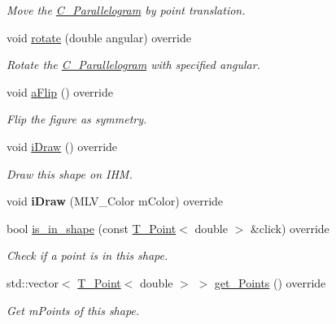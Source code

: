 \begin{DoxyCompactItemize}
\begin{DoxyCompactList}\small\item\em Move the \hyperlink{classParallelogram}{C_Parallelogram} by point translation. \end{DoxyCompactList}\item
void \hyperlink{classParallelogram_ac498f6a15dea236ecc49bece023d17b0}{rotate} (double angular) override
\begin{DoxyCompactList}\small\item\em Rotate the \hyperlink{classParallelogram}{C_Parallelogram} with specified angular. \end{DoxyCompactList}\item
\mbox{\label{classParallelogram_a51f002e90b7bf6c5d875cc094c22f7c1}} 
void \hyperlink{classParallelogram_a51f002e90b7bf6c5d875cc094c22f7c1}{aFlip} () override
\begin{DoxyCompactList}\small\item\em Flip the figure as symmetry. \end{DoxyCompactList}\item 
\mbox{\label{classParallelogram_a73e3657bf024787b57ccdd8035a6fdef}} 
void \hyperlink{classParallelogram_a73e3657bf024787b57ccdd8035a6fdef}{iDraw} () override
\begin{DoxyCompactList}\small\item\em Draw this shape on I\+HM. \end{DoxyCompactList}\item 
\mbox{\label{classParallelogram_a4c819c66cd206e71a86e863e266ff356}} 
void {\bfseries iDraw} (M\+L\+V\+\_\+\+Color mColor) override
\item 
bool \hyperlink{classParallelogram_a585b14ca0f65ed3a5007e8c1df3c6bc4}{is\+\_\+in\+\_\+shape} (const \hyperlink{classPoint}{T_Point}$<$ double $>$ \&click) override
\begin{DoxyCompactList}\small\item\em Check if a point is in this shape. \end{DoxyCompactList}\item 
std\+::vector$<$ \hyperlink{classPoint}{T_Point}$<$ double $>$ $>$ \hyperlink{classParallelogram_a17c9986712806a8b07d90e444e0a543d}{get\+\_\+\+Points} () override
\begin{DoxyCompactList}\small\item\em Get mPoints of this shape. \end{DoxyCompactList}\item

\end{DoxyCompactItemize}
